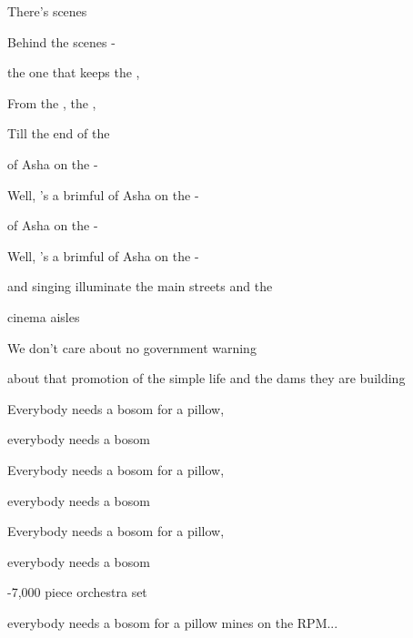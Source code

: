 
\zs
There's    scenes

Behind the  scenes -  

 the one that keeps the  ,

From the ,  the ,

Till the end of the 
\ks

\zr
{} of Asha on the -

Well, 's a brimful of Asha on the -

 of Asha on the -

Well, 's a brimful of Asha on the -
\kr

\zs
and singing illuminate the main streets and the 

cinema aisles

We don't care about no government warning

about that promotion of the simple life and the dams they are building
\ks

\zs
Everybody needs a bosom for a pillow,

everybody needs a bosom

Everybody needs a bosom for a pillow,

everybody needs a bosom

Everybody needs a bosom for a pillow,

everybody needs a bosom
\ks

\zr \kr

\zr \kr

-7,000 piece orchestra set

everybody needs a bosom for a pillow mines on the RPM...
\ks
\kp